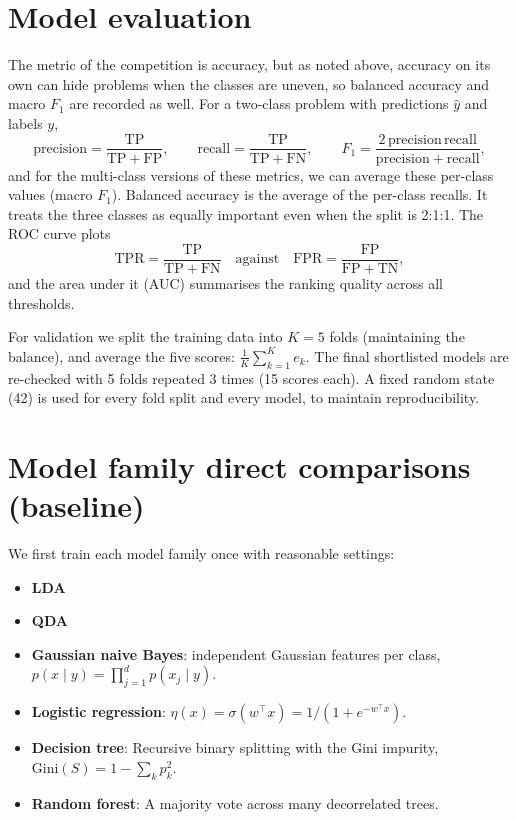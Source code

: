 \documentclass[11pt]{article}
\begin{document}
\section{Model evaluation}

The metric of the competition is accuracy, but as noted above, accuracy on its own can hide problems when the classes are uneven, so balanced accuracy and macro $F_1$ are recorded as well. For a two-class problem with predictions $\hat{y}$ and labels $y$,
\[
  \mathrm{precision} = \frac{\mathrm{TP}}{\mathrm{TP}+\mathrm{FP}}, \qquad
  \mathrm{recall} = \frac{\mathrm{TP}}{\mathrm{TP}+\mathrm{FN}}, \qquad
  F_1 = \frac{2\,\mathrm{precision}\,\mathrm{recall}}
            {\mathrm{precision}+\mathrm{recall}},
\]
and for the multi-class versions of these metrics, we can average these per-class values (macro $F_1$). Balanced accuracy is the average of the per-class recalls. It treats the three classes as equally important even when the split is 2:1:1. The ROC curve plots
\[
  \mathrm{TPR} = \frac{\mathrm{TP}}{\mathrm{TP}+\mathrm{FN}} \quad\text{against}\quad
  \mathrm{FPR} = \frac{\mathrm{FP}}{\mathrm{FP}+\mathrm{TN}},
\]
and the area under it (AUC) summarises the ranking quality across all thresholds.

For validation we split the training data into $K=5$ folds (maintaining the balance), and average the five scores: $\frac{1}{K}\sum_{k=1}^{K} e_k$. The final shortlisted models are re-checked with 5 folds repeated 3 times (15 scores each). A fixed random state (42) is used for every fold split and every model, to maintain reproducibility.

\section{Model family direct comparisons (baseline)}

We first train each model family once with reasonable settings:

\begin{itemize}
  \item \textbf{LDA}
  \item \textbf{QDA}
  \item \textbf{Gaussian naive Bayes}: independent Gaussian features per class, $p(x\mid y) = \prod_{j=1}^{d} p(x_j\mid y)$.
  \item \textbf{Logistic regression}: $\eta(x) = \sigma(w^\top x) = 1/(1+e^{-w^\top x})$.
  \item \textbf{Decision tree}: Recursive binary splitting with the Gini impurity, $\mathrm{Gini}(S) = 1 - \sum_k p_k^2$.
  \item \textbf{Random forest}: A majority vote across many decorrelated trees.
\end{itemize}
\end{document}
